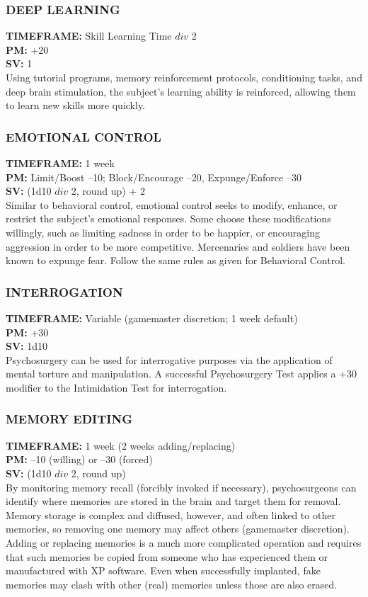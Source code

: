 \subsubsection{DEEP LEARNING}
\textbf{TIMEFRAME:} Skill Learning Time $div$ 2 \\
\textbf{PM:} +20 \\
\textbf{SV:} 1 \\
Using tutorial programs, memory reinforcement protocols,
conditioning tasks, and deep brain stimulation,
the subject’s learning ability is reinforced, allowing
them to learn new skills more quickly.

\subsubsection{EMOTIONAL CONTROL}
\textbf{TIMEFRAME:} 1 week \\
\textbf{PM:} Limit/Boost –10; Block/Encourage –20, Expunge/Enforce –30 \\
\textbf{SV:} (1d10 $div$ 2, round up) + 2 \\
Similar to behavioral control, emotional control seeks
to modify, enhance, or restrict the subject’s emotional
responses. Some choose these modifications willingly,
such as limiting sadness in order to be happier, or
encouraging aggression in order to be more competitive.
Mercenaries and soldiers have been known
to expunge fear. Follow the same rules as given for
Behavioral Control.


\subsubsection{INTERROGATION}
\textbf{TIMEFRAME:} Variable (gamemaster discretion; 1 week default) \\
\textbf{PM:} +30 \\
\textbf{SV:} 1d10 \\
Psychosurgery can be used for interrogative purposes
via the application of mental torture and manipulation.
A successful Psychosurgery Test applies a +30
modifier to the Intimidation Test for interrogation.

\subsubsection{MEMORY EDITING}
\textbf{TIMEFRAME:} 1 week (2 weeks adding/replacing) \\
\textbf{PM:} –10 (willing) or –30 (forced) \\
\textbf{SV:} (1d10 $div$ 2, round up) \\
By monitoring memory recall (forcibly invoked if necessary),
psychosurgeons can identify where memories
are stored in the brain and target them for removal.
Memory storage is complex and diffused, however,
and often linked to other memories, so removing one
memory may affect others (gamemaster discretion).
Adding or replacing memories is a much more complicated
operation and requires that such memories be
copied from someone who has experienced them or
manufactured with XP software. Even when successfully
implanted, fake memories may clash with other
(real) memories unless those are also erased.

